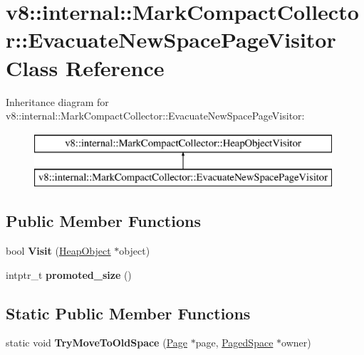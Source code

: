 \hypertarget{classv8_1_1internal_1_1_mark_compact_collector_1_1_evacuate_new_space_page_visitor}{}\section{v8\+:\+:internal\+:\+:Mark\+Compact\+Collector\+:\+:Evacuate\+New\+Space\+Page\+Visitor Class Reference}
\label{classv8_1_1internal_1_1_mark_compact_collector_1_1_evacuate_new_space_page_visitor}
Inheritance diagram for v8\+:\+:internal\+:\+:Mark\+Compact\+Collector\+:\+:Evacuate\+New\+Space\+Page\+Visitor\+:\begin{figure}[H]
\begin{center}
\leavevmode
\includegraphics[height=2.000000cm]{classv8_1_1internal_1_1_mark_compact_collector_1_1_evacuate_new_space_page_visitor}
\end{center}
\end{figure}
\subsection*{Public Member Functions}
\begin{DoxyCompactItemize}
\item 
bool {\bfseries Visit} (\hyperlink{classv8_1_1internal_1_1_heap_object}{Heap\+Object} $\ast$object)\hypertarget{classv8_1_1internal_1_1_mark_compact_collector_1_1_evacuate_new_space_page_visitor_a263b417364d0db8de45b44135c905130}{}\label{classv8_1_1internal_1_1_mark_compact_collector_1_1_evacuate_new_space_page_visitor_a263b417364d0db8de45b44135c905130}

\item 
intptr\+\_\+t {\bfseries promoted\+\_\+size} ()\hypertarget{classv8_1_1internal_1_1_mark_compact_collector_1_1_evacuate_new_space_page_visitor_adffc3fe77fb54f24f59059c8519051e5}{}\label{classv8_1_1internal_1_1_mark_compact_collector_1_1_evacuate_new_space_page_visitor_adffc3fe77fb54f24f59059c8519051e5}

\end{DoxyCompactItemize}
\subsection*{Static Public Member Functions}
\begin{DoxyCompactItemize}
\item 
static void {\bfseries Try\+Move\+To\+Old\+Space} (\hyperlink{classv8_1_1internal_1_1_page}{Page} $\ast$page, \hyperlink{classv8_1_1internal_1_1_paged_space}{Paged\+Space} $\ast$owner)\hypertarget{classv8_1_1internal_1_1_mark_compact_collector_1_1_evacuate_new_space_page_visitor_a9b2983f282003786bc7e134b525101f8}{}\label{classv8_1_1internal_1_1_mark_compact_collector_1_1_evacuate_new_space_page_visitor_a9b2983f282003786bc7e134b525101f8}

\end{DoxyCompactItemize}

